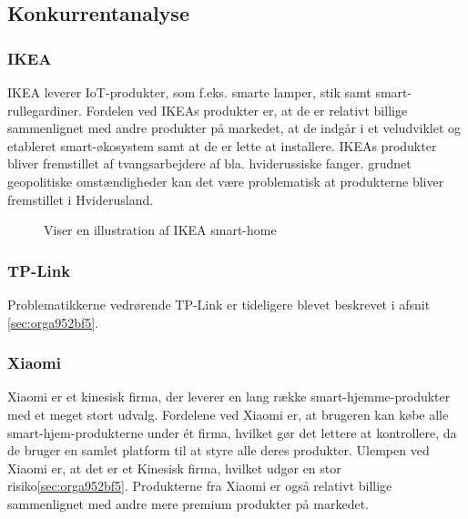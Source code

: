 \documentclass[11pt]{article}
\begin{document}
\subsection{Konkurrentanalyse}
\label{sec:konkurrentanalyse}
\subsubsection{IKEA}
IKEA leverer IoT-produkter, som f.eks. smarte lamper, stik samt smart-rullegardiner. Fordelen ved IKEAs produkter er, at de er relativt billige sammenlignet med andre produkter på markedet, at de indgår i et veludviklet og etableret smart-økosystem samt at de er lette at installere.
IKEAs produkter bliver fremstillet af tvangsarbejdere af bla. hviderussiske fanger.  grudnet geopolitiske omstændigheder kan det være problematisk at produkterne bliver fremstillet i Hviderusland.
\begin{figure}[htbp]
\centering
{}
\caption{Viser en illustration af IKEA smart-home}
\end{figure}
\subsubsection{TP-Link}
Problematikkerne vedrørende TP-Link er tideligere blevet beskrevet i afsnit \ref{sec:orga952bf5}.
\subsubsection{Xiaomi}
Xiaomi er et kinesisk firma, der leverer en lang række smart-hjemme-produkter med et meget stort udvalg. Fordelene ved Xiaomi er, at brugeren kan købe alle smart-hjem-produkterne under ét firma, hvilket gør det lettere at kontrollere, da de bruger en samlet platform til at styre alle deres produkter. Ulempen ved Xiaomi er, at det er et Kinesisk firma, hvilket udgør en stor risiko\ref{sec:orga952bf5}. Produkterne fra Xiaomi er også relativt billige sammenlignet med andre mere premium produkter på markedet.
\end{document}
